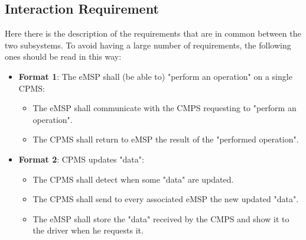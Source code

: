 \subsection{Interaction Requirement}
Here there is the description of the requirements that are in common between the two subsystems. To avoid having a large number of requirements, the following ones should be read in this way:\\
\begin{itemize}
    \item\textbf{Format 1}: The eMSP shall (be able to) "perform an operation" on a single CPMS:
    \begin{itemize}
        \item The eMSP shall communicate with the CMPS requesting to "perform an operation".
        \item The CPMS shall return to eMSP the result of the "performed operation".
    \end{itemize}
    \item \textbf{Format 2}: CPMS updates "data":
    \begin{itemize}
        \item The CPMS shall detect when some "data" are updated.
        \item The CPMS shall send to every associated eMSP the new updated "data".
        \item The eMSP shall store the "data" received by the CMPS and show it to the driver when he requests it.
    \end{itemize}
\end{itemize}
